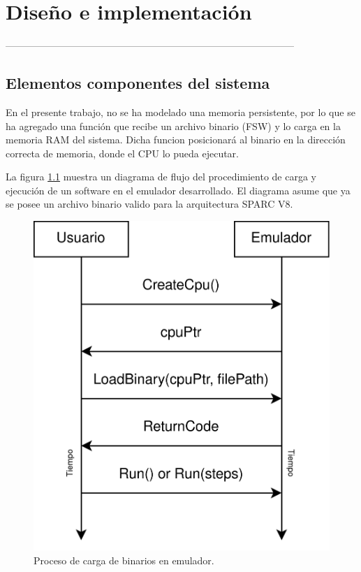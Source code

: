 \chapter{Diseño e implementación} %

\label{Chapter3}


-----------------------------------------------------------------------------------------
\section{Elementos componentes del sistema}
\label{sec:elementos_componentes_sistema}


En el presente trabajo, no se ha modelado una memoria persistente, por lo que se ha agregado una función que recibe un archivo binario (FSW) y lo carga en la memoria RAM del sistema. Dicha funcion posicionará al binario en la dirección correcta de memoria, donde el CPU lo pueda ejecutar.

La figura \ref{fig:carga_binario} muestra un diagrama de flujo del procedimiento de carga y ejecución de un software en el emulador desarrollado. El diagrama asume que ya se posee un archivo binario valido para la arquitectura SPARC V8.

\begin{figure}[htbp]
	\centering
	\includegraphics[width=.6\textwidth]{./Figures/carga_binario}
	\caption{Proceso de carga de binarios en emulador.}
	\label{fig:carga_binario}
\end{figure}

